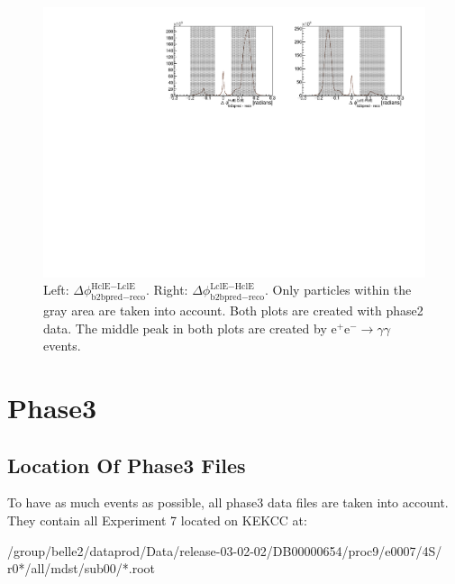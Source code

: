 \documentclass[a4paper,11pt,twosided,final,german,openbib,pdftex,listof=totoc,bibliography=totoc]{scrbook}
\begin{document}
\begin{appendix}
\begin{figure}[h!]
	\centering
	\includegraphics[width=\textwidth]{Plots/master/hb2b_Data.pdf}
	\caption[b2bClusterPhi - clusterPhi For Phase2 Data]{Left: $\Delta \phi _{\textrm{b2bpred} - \textrm{reco}}^{\textrm{HclE}-\textrm{LclE}}$. Right:  $\Delta \phi _{\textrm{b2bpred} - \textrm{reco}}^{\textrm{LclE}-\textrm{HclE}}$. Only particles within the gray area are taken into account. Both plots are created with phase2 data. The middle peak in both plots are created by $\textrm{e}^+\textrm{e}^- \rightarrow \gamma \gamma$ events.}
	\label{fig:b2bData2}
\end{figure}














\clearpage
\section{Phase3}


\subsection{Location Of Phase3 Files}



To have as much events as possible, all phase3 data files are taken into account. They contain all Experiment 7 located on KEKCC at:
\newline

/group/belle2/dataprod/Data/release-03-02-02/DB00000654/proc9/e0007/4S/
r0*/all/mdst/sub00/*.root
\newline 


\end{appendix}
\end{document}
